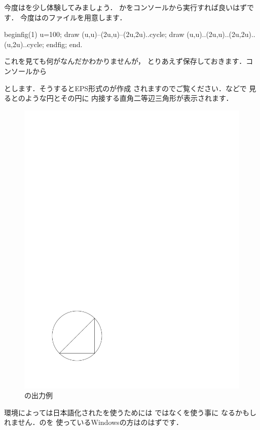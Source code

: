 今度は{\MP}を少し体験してみましょう．
かをコンソールから実行すれば良いはずです．
今度は{\MP}のファイルを用意します．

\begin{InText}
beginfig(1)
u=100;
draw (u,u)--(2u,u)--(2u,2u)..cycle;
draw (u,u)..(2u,u)..(2u,2u)..(u,2u)..cycle;
endfig;
end. 
\end{InText}

これを見ても何がなんだかわかりませんが，
とりあえず保存しておきます．コンソールから
\begin{InTerm}
\end{InTerm}
とします．そうするとEPS形式のが作成
されますのでご覧ください．\prog{\GS}などで
見るとのような円とその円に
内接する直角二等辺三角形が表示されます．
\begin{figure}[htbp]
 \begin{center}
  \includegraphics[clip,bb={74 74 225 225}]{images/mpsample}
  \caption{{\protect\MP}の出力例}
 \end{center}
\end{figure}
環境によっては日本語化された{\MP}を使うためには
ではなくを使う事に
なるかもしれません．の{\pTeX}を
使っているWindowsの方はのはずです．


